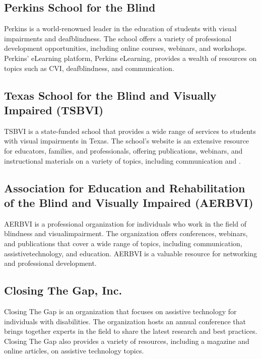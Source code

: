 \subsection{Perkins School for the Blind}\label{app6:perkins}
Perkins is a world-renowned leader in the education of students with visual impairments and deafblindness. The school offers a variety of professional development opportunities, including online courses, webinars, and workshops. Perkins' eLearning platform, Perkins eLearning, provides a wealth of resources on topics such as CVI, deafblindness, and communication.

\subsection{Texas School for the Blind and Visually Impaired (TSBVI)}\label{app6:tsbvi}
TSBVI is a state-funded school that provides a wide range of services to students with visual impairments in Texas. The school's website is an extensive resource for educators, families, and professionals, offering publications, webinars, and instructional materials on a variety of topics, including communication and .

\subsection{Association for Education and Rehabilitation of the Blind and Visually Impaired (AERBVI)}\label{app6:aerbvi}
AERBVI is a professional organization for individuals who work in the field of blindness and \gls{visualimpairment}. The organization offers conferences, webinars, and publications that cover a wide range of topics, including communication, \gls{assistivetechnology}, and education. AERBVI is a valuable resource for networking and professional development.

\subsection{Closing The Gap, Inc.}\label{app6:ctg}
Closing The Gap is an organization that focuses on assistive \gls{technology} for individuals with disabilities. The organization hosts an annual conference that brings together experts in the field to share the latest research and best practices. Closing The Gap also provides a variety of resources, including a magazine and online articles, on assistive \gls{technology} topics.

